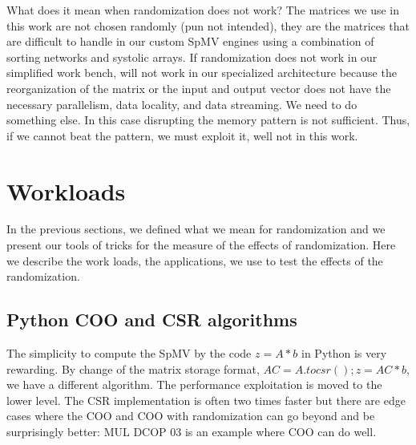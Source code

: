 \documentclass[manuscript,screen]{acmart}
\begin{document}



What does it mean when randomization does not work? The matrices we
use in this work are not chosen randomly (pun not intended), they are
the matrices that are difficult to handle in our custom SpMV engines
using a combination of sorting networks and systolic arrays. If
randomization does not work in our simplified work bench, will not
work in our specialized architecture because the reorganization of the
matrix or the input and output vector does not have the necessary
parallelism, data locality, and data streaming. We need to do
something else. In this case disrupting the memory pattern is not
sufficient. Thus, if we cannot beat the pattern, we must exploit it,
well not in this work.

\section{Workloads}
\label{sec:workload}

In the previous sections, we defined what we mean for randomization
and we present our tools of tricks for the measure of the effects of
randomization. Here we describe the work loads, the applications, we
use to test the effects of the randomization.

\subsection{Python COO and CSR algorithms}
\label{sec:pythoncoocsr}
The simplicity to compute the SpMV by the code $z = A*b$ in Python is
very rewarding. By change of the matrix storage format, $AC =
A.tocsr(); z = AC*b$, we have a different algorithm. The performance
exploitation is moved to the lower level.  The CSR implementation is
often two times faster but there are edge cases where the COO and COO
with randomization can go beyond and be surprisingly better: MUL DCOP
03 is an example where COO can do well.
\end{document}

